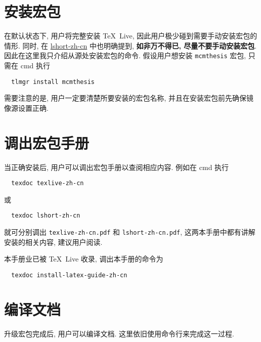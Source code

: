 \section{安装宏包}

在默认状态下, 用户将完整安装 \TeX~Live, 因此用户极少碰到需要手动安装宏包的情形.
同时, 在
\href{http://mirrors.ctan.org/info/lshort/chinese/lshort-zh-cn.pdf}{\textsf{lshort-zh-cn}}
中也明确提到, \textbf{如非万不得已, 尽量不要手动安装宏包}.
因此在这里我只介绍从源处安装宏包的命令.
假设用户想安装 \texttt{mcmthesis} 宏包, 只需在 \textsf{cmd} 执行
\begin{lstlisting}
  tlmgr install mcmthesis
\end{lstlisting}
需要注意的是, 用户一定要清楚所要安装的宏包名称, 并且在安装宏包前先确保镜像源设置正确.

\section{调出宏包手册}

当正确安装后,
用户可以调出宏包手册以查阅相应内容.
例如在 \textsf{cmd} 执行
\begin{lstlisting}
  texdoc texlive-zh-cn
\end{lstlisting}
或
\begin{lstlisting}
  texdoc lshort-zh-cn
\end{lstlisting}
就可分别调出 \texttt{texlive-zh-cn.pdf} 和 \texttt{lshort-zh-cn.pdf},
这两本手册中都有讲解安装的相关内容,
建议用户阅读.

本手册业已被 \TeX~Live 收录,
调出本手册的命令为
\begin{lstlisting}
  texdoc install-latex-guide-zh-cn
\end{lstlisting}

\section{编译文档}\label{sec:windows:compile}

升级宏包完成后, 用户可以编译文档.
这里依旧使用命令行来完成这一过程.

